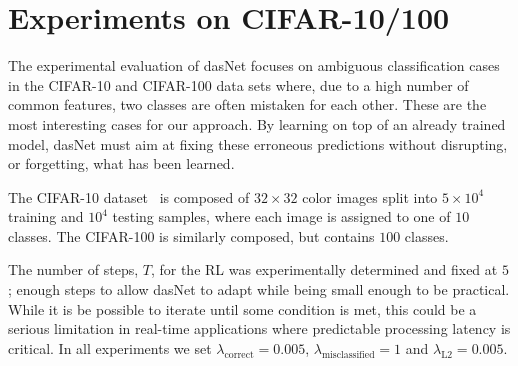 \section{Experiments on CIFAR-10/100}
\label{sec:experiments}

The experimental evaluation of dasNet focuses on ambiguous
classification cases in the CIFAR-10 and CIFAR-100 data sets where,
due to a high number of common features, two classes are often
mistaken for each other.  These are the most interesting cases for our
approach.  By learning on top of an already trained model, dasNet must
aim at fixing these erroneous predictions without disrupting, or
forgetting, what has been learned.

The CIFAR-10 dataset~\cite{krizhevsky:2009} is composed of $32 \times
32$ color images split into $5 \times 10^4$ training and $10^4$
testing samples, where each image is assigned to one of $10$ classes.
The CIFAR-100 is similarly composed, but contains $100$ classes.



The number of steps, $T$, for the RL was experimentally determined and
fixed at $5$; enough steps to allow dasNet to adapt while being small
enough to be practical.  While it is be possible to iterate until some
condition is met, this could be a serious limitation in real-time
applications where predictable processing latency is critical.  In all
experiments we set $\lambda_{\text{correct}} = 0.005$,
$\lambda_{\text{misclassified}} = 1$ and $\lambda_{\text{L2}} =
0.005$.



